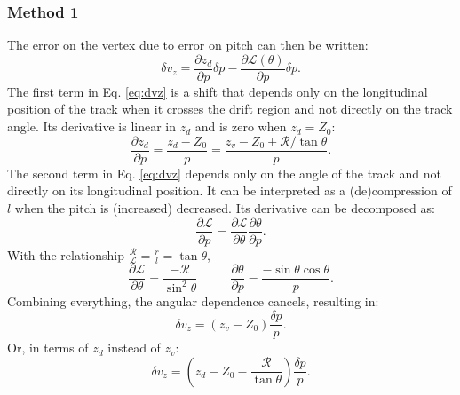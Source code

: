 \documentclass[amsmath,amssymb,notitlepage,11pt]{revtex4-1}
\begin{document}
\subsubsection{Method 1}
The error on the vertex due to error on pitch can then be written:
\begin{equation}
    \delta v_z = \frac{\partial z_d}{\partial p}\delta p - \frac{\partial \mathcal{L}(\theta)}{\partial p}\delta p.
    \label{eq:dvz}
\end{equation}
The first term in Eq. \ref{eq:dvz} is a shift that depends only on the longitudinal position of the track when it crosses the drift region and not directly on the track angle.  Its derivative is linear in $z_d$ and is zero when $z_d=Z_0$:
\begin{equation}
    \frac{\partial z_d}{\partial p} = \frac{z_d-Z_0}{p} = \frac{z_v-Z_0+\mathcal{R}/\tan\theta}{p}.
    \label{}
\end{equation}
The second term in Eq. \ref{eq:dvz} depends only on the angle of the track and not directly on its longitudinal position.  It can be interpreted as a (de)compression of $l$ when the pitch is (increased) decreased.  Its derivative can be decomposed as:
\begin{equation}
    \frac{\partial\mathcal{L}}{\partial p} = \frac{\partial\mathcal{L}}{\partial\theta}\frac{\partial\theta}{\partial p}.
    \label{}
\end{equation}
With the relationship $\frac{\mathcal{R}}{\mathcal{L}}=\frac{r}{l}=\tan\theta$, 
\begin{equation}
    \frac{\partial\mathcal{L}}{\partial\theta} = \frac{-\mathcal{R}}{\sin^2\theta}\ \ \ \ \ \ \ \ \ \ \ \  
    \frac{\partial\theta}{\partial p} = \frac{-\sin\theta\cos\theta}{p}.
    \label{}
\end{equation}
Combining everything, the angular dependence cancels, resulting in:
\begin{equation}
    \delta v_z = (z_v-Z_0)\frac{\delta p}{p}.
    \label{eq:dz}
\end{equation}
Or, in terms of $z_d$ instead of $z_v$:
\begin{equation}
    \delta v_z = (z_d-Z_0-\frac{\mathcal{R}}{\tan\theta})\frac{\delta p}{p}.
    \label{eq:dz_angle}
\end{equation}
\end{document}
